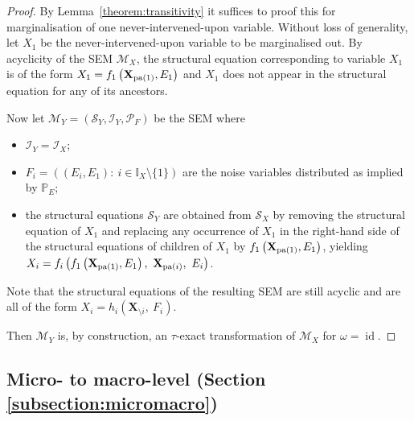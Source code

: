 \medskip


\begin{proof}
By Lemma~\ref{theorem:transitivity} it suffices to proof this for marginalisation of one never-intervened-upon variable.
Without loss of generality, let $X_1$ be the never-intervened-upon variable to be marginalised out.
By acyclicity of the SEM $\mathcal{M}_X$, the structural equation corresponding to variable $X_1$ is of the form $X_1 = f_1\left(\mathbf{X}_{\operatorname{pa}(1)},E_1\right)$ and $X_1$ does not appear in the structural equation for any of its ancestors.

Now let $\mathcal{M}_Y=(\mathcal{S}_Y,\mathcal{I}_Y,\mathcal{P}_F)$ be the SEM where
%
\begin{itemize}
    \item $\mathcal{I}_Y = \mathcal{I}_X$;
    \item $F_i = ((E_i,E_1):\ i \in \mathbb{I}_X\setminus\{1\})$ are the noise variables distributed as implied by $\mathbb{P}_E$;
    \item the structural equations $\mathcal{S}_Y$ are obtained from $\mathcal{S}_X$ by removing the structural equation of $X_1$ and replacing any occurrence of $X_1$ in the right-hand side of the structural equations of children of $X_1$ by $f_1\left(\mathbf{X}_{\operatorname{pa}(1)},E_1\right)$, yielding $X_i = f_i\left(f_1\left(\mathbf{X}_{\pa(1)},E_1\right),\ \mathbf{X}_{\pa(i)},\ E_i\right)$.
\end{itemize}
%
Note that the structural equations  of the resulting SEM are still acyclic and are all of the form $X_i = h_i\left(\mathbf{X}_{\setminus i},\ F_i\right)$.

Then $\mathcal{M}_Y$ is, by construction, an $\tau$-exact transformation of $\mathcal{M}_X$ for $\omega=\operatorname{id}$.
%
\end{proof}



\subsection{Micro- to macro-level (Section \ref{subsection:micromacro})}

